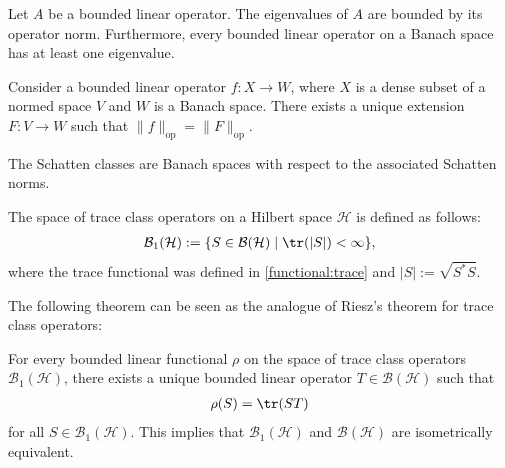     \begin{property}
        Let $A$ be a bounded linear operator. The eigenvalues of $A$ are bounded by its operator norm. Furthermore, every bounded linear operator on a Banach space has at least one eigenvalue.
    \end{property}

    \begin{property}
        Consider a bounded linear operator $f:X\rightarrow W$, where $X$ is a dense subset of a normed space $V$ and $W$ is a Banach space. There exists a unique extension $F:V\rightarrow W$ such that $\|f\|_\mathrm{op} = \|F\|_\mathrm{op}$.
    \end{property}

    \begin{property}
        The Schatten classes are Banach spaces with respect to the associated Schatten norms.
    \end{property}

    \begin{example}
        The space of trace class operators on a Hilbert space $\mathcal{H}$ is defined as follows:
        \begin{gather}
            \mathcal{B}_1(\mathcal{H}) := \{S\in\mathcal{B}(\mathcal{H})\mid\tr(|S|)<\infty\},
        \end{gather}
        where the trace functional was defined in \ref{functional:trace} and $|S|:=\sqrt{S^*S}$.
    \end{example}
    The following theorem can be seen as the analogue of Riesz's theorem for trace class operators:
    \begin{property}
        For every bounded linear functional $\rho$ on the space of trace class operators $\mathcal{B}_1(\mathcal{H})$, there exists a unique bounded linear operator $T\in\mathcal{B}(\mathcal{H})$ such that
        \begin{gather}
            \rho(S) = \tr(ST)
        \end{gather}
        for all $S\in\mathcal{B}_1(\mathcal{H})$. This implies that $\mathcal{B}_1(\mathcal{H})$ and $\mathcal{B}(\mathcal{H})$ are isometrically equivalent.
    \end{property}

